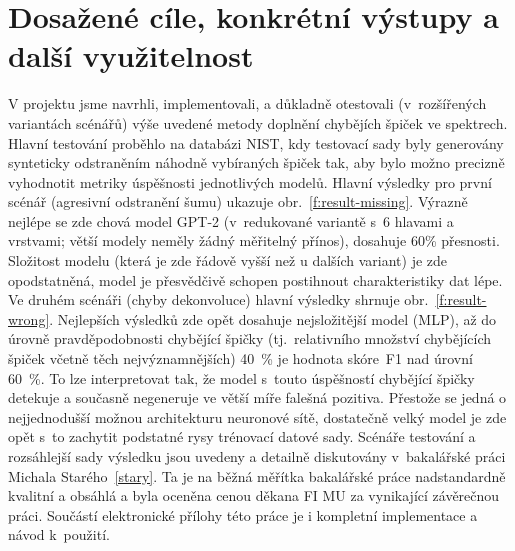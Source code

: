 \documentclass[a4paper,11pt]{article}
\begin{document}









\section{Dosažené cíle, konkrétní výstupy a další využitelnost}
\label{cile}



V projektu jsme navrhli, implementovali, a důkladně otestovali (v~rozšířených variantách scénářů)
výše uvedené metody doplnění chybějích špiček ve spektrech.
Hlavní testování proběhlo na databázi NIST, kdy testovací sady byly generovány synteticky
odstraněním náhodně vybíraných špiček tak, aby bylo možno precizně vyhodnotit metriky 
úspěšnosti jednotlivých modelů.
Hlavní výsledky pro první scénář (agresivní odstranění šumu) ukazuje obr.~\ref{f:result-missing}.
Výrazně nejlépe se zde chová model GPT-2 (v~redukované variantě s~6 hlavami a vrstvami; větší modely neměly
žádný měřitelný přínos), dosahuje 60\% přesnosti.
Složitost modelu (která je zde řádově vyšší než u dalších variant) je zde opodstatněná,
model je přesvědčivě schopen postihnout charakteristiky dat lépe.
Ve druhém scénáři (chyby dekonvoluce) hlavní výsledky shrnuje obr.~\ref{f:result-wrong}.
Nejlepších výsledků zde opět dosahuje nejsložitější model (MLP), až do úrovně pravděpodobnosti chybějící špičky
(tj.\ relativního množství chybějících špiček včetně těch nejvýznamnějších) 40~\% je hodnota skóre~F1 nad úrovní
60~\%. To lze interpretovat tak, že model s~touto úspěšností chybějící špičky detekuje
a současně negeneruje ve větší míře falešná pozitiva.
Přestože se jedná o nejjednodušší možnou architekturu neuronové sítě, dostatečně velký model
je zde opět s~to zachytit podstatné rysy trénovací datové sady.
Scénáře testování a rozsáhlejší sady výsledku jsou uvedeny a
detailně diskutovány v~bakalářské práci Michala Starého~\ref{stary}.
Ta je na běžná měřítka bakalářské práce nadstandardně kvalitní a obsáhlá 
a byla oceněna cenou děkana FI MU za vynikající závěrečnou práci.
Součástí elektronické přílohy této práce je i kompletní implementace a návod k~použití.
\end{document}
